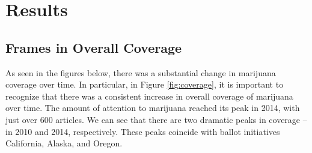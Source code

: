 


\section{Results}

\subsection{Frames in Overall Coverage}
As seen in the figures below, there was a substantial change in marijuana coverage over time. In particular, in Figure \ref{fig:coverage}, it is important to recognize that there was a consistent increase in overall coverage of marijuana over time. The amount of attention to marijuana reached its peak in 2014, with just over 600 articles. We can see that there are two dramatic peaks in coverage -- in 2010 and 2014, respectively. These peaks coincide with ballot initiatives California, Alaska, and Oregon. 






